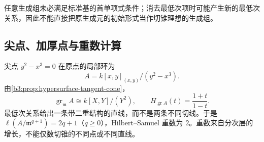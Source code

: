 任意生成组未必满足标准基的首单项式条件；消去最低次项时可能产生新的最低次关系，因此不能直接把原生成元的初始形式当作切锥理想的生成组。

\subsection{尖点、加厚点与重数计算}
\label{b3:subsec:F03:03}

尖点 \(y^2-x^3=0\) 在原点的局部环为
\[
	A=k[x,y]_{(x,y)}/(y^2-x^3).
\]
由\cref{b3:prop:hypersurface-tangent-cone}，
\[
	\operatorname{gr}_{\mathfrak m}A\cong k[X,Y]/(Y^2), \qquad H_{\operatorname{gr}A}(t)=\frac{1+t}{1-t}.
\]
最低次关系给出一条带二重结构的直线，而不是两条不同切线。于是 \(\ell(A/\mathfrak m^{q+1})=2q+1\)（\(q\ge0\)），Hilbert--Samuel 重数为 \(2\)。重数来自分次层的增长，不能仅数切锥的不同点或不同直线。

